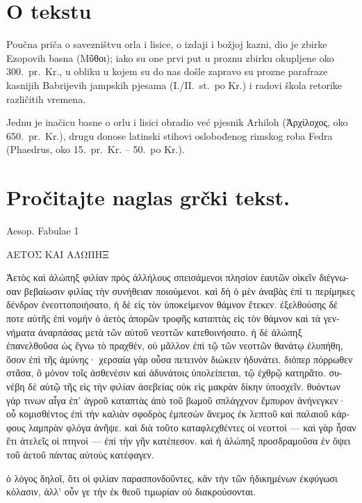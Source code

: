 


\section*{O tekstu}

Poučna priča o savezništvu orla i lisice, o izdaji i božjoj kazni, dio je zbirke Ezopovih basna \textgreek[variant=ancient]{(Μῦθοι);} iako su one prvi put u proznu zbirku okupljene oko 300.\ pr.~Kr., u obliku u kojem su do nas došle zapravo su prozne parafraze kasnijih Babrijevih jampskih pjesama (I./II.\ st.\ po Kr.) i radovi škola retorike različitih vremena. 

Jednu je inačicu basne o orlu i lisici obradio već pjesnik Arhiloh \textgreek[variant=ancient]{(Ἀρχίλοχος,} oko 650.\ pr.~Kr.), drugu donose latinski stihovi oslobođenog rimskog roba Fedra (Phaedrus, oko 15.\ pr.~Kr. – 50.\ po Kr.).


\section*{Pročitajte naglas grčki tekst.}
Aesop. Fabulae 1

\medskip

{\large
\begin{greek}
\noindent ΑΕΤΟΣ ΚΑΙ ΑΛΩΠΗΞ

\noindent Ἀετὸς καὶ ἀλώπηξ φιλίαν πρὸς ἀλλήλους σπεισάμενοι πλησίον ἑαυτῶν οἰκεῖν διέγνωσαν βεβαίωσιν φιλίας τὴν συνήθειαν ποιούμενοι. καὶ δὴ ὁ μὲν ἀναβὰς ἐπί τι περίμηκες δένδρον ἐνεοττοποιήσατο, ἡ δὲ εἰς τὸν ὑποκείμενον θάμνον ἔτεκεν. ἐξελθούσης δέ ποτε αὐτῆς ἐπὶ νομὴν ὁ ἀετὸς ἀπορῶν τροφῆς καταπτὰς εἰς τὸν θάμνον καὶ τὰ γεννήματα ἀναρπάσας μετὰ τῶν αὑτοῦ νεοττῶν κατεθοινήσατο. ἡ δὲ ἀλώπηξ ἐπανελθοῦσα ὡς ἔγνω τὸ πραχθέν, οὐ μᾶλλον ἐπὶ τῷ τῶν νεοττῶν θανάτῳ ἐλυπήθη, ὅσον ἐπὶ τῆς ἀμύνης· χερσαία γὰρ οὖσα πετεινὸν διώκειν ἠδυνάτει. διόπερ πόρρωθεν στᾶσα, ὃ μόνον τοῖς ἀσθενέσιν καὶ ἀδυνάτοις ὑπολείπεται, τῷ ἐχθρῷ κατηρᾶτο. συνέβη δὲ αὐτῷ τῆς εἰς τὴν φιλίαν ἀσεβείας οὐκ εἰς μακρὰν δίκην ὑποσχεῖν. θυόντων γάρ τινων αἶγα ἐπ' ἀγροῦ καταπτὰς ἀπὸ τοῦ βωμοῦ σπλάγχνον ἔμπυρον ἀνήνεγκεν· οὗ κομισθέντος ἐπὶ τὴν καλιὰν σφοδρὸς ἐμπεσὼν ἄνεμος ἐκ λεπτοῦ καὶ παλαιοῦ κάρφους λαμπρὰν φλόγα ἀνῆψε. καὶ διὰ τοῦτο καταφλεχθέντες οἱ νεοττοὶ — καὶ γὰρ ἦσαν ἔτι ἀτελεῖς οἱ πτηνοὶ — ἐπὶ τὴν γῆν κατέπεσον. καὶ ἡ ἀλώπηξ προσδραμοῦσα ἐν ὄψει τοῦ ἀετοῦ πάντας αὐτοὺς κατέφαγεν. 

ὁ λόγος δηλοῖ, ὅτι οἱ φιλίαν παρασπονδοῦντες, κἂν τὴν τῶν ἠδικημένων ἐκφύγωσι κόλασιν, ἀλλ' οὖν γε τὴν ἐκ θεοῦ τιμωρίαν οὐ διακρούσονται.

\end{greek}
}

